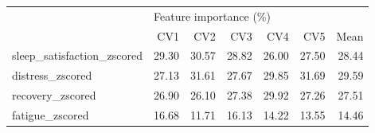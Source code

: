 \begin{tabular}{lrrrrrr}
\toprule
{} & \multicolumn{6}{l}{Feature importance (\%)} \\
{} &                    CV1 &    CV2 &    CV3 &    CV4 &    CV5 &   Mean \\
\midrule
sleep\_satisfaction\_zscored &                  29.30 &  30.57 &  28.82 &  26.00 &  27.50 &  28.44 \\
distress\_zscored           &                  27.13 &  31.61 &  27.67 &  29.85 &  31.69 &  29.59 \\
recovery\_zscored           &                  26.90 &  26.10 &  27.38 &  29.92 &  27.26 &  27.51 \\
fatigue\_zscored            &                  16.68 &  11.71 &  16.13 &  14.22 &  13.55 &  14.46 \\
\bottomrule
\end{tabular}

